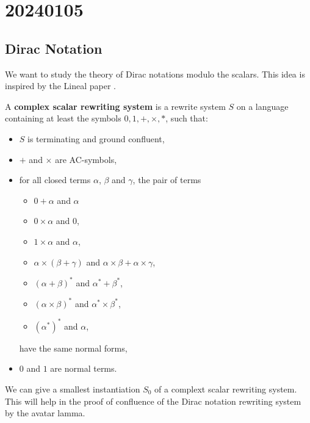 \chapter{20240105}

\newcommand*{\unit}{\texttt{unit}}
\newcommand*{\utt}{\texttt{tt}}
\newcommand*{\fst}{\texttt{fst}}
\newcommand*{\snd}{\texttt{snd}}
\newcommand*{\reduce}{\ \triangleright\ }

\section{Dirac Notation}

We want to study the theory of Dirac notations modulo the scalars. This idea is inspired by the Lineal paper \cite{Arrighi2017}.

\begin{definition}
  A \textbf{complex scalar rewriting system} is a rewrite system $S$ on a language containing at least the symbols $0, 1, +, \times, *$, such that:
  \begin{itemize}
    \item $S$ is terminating and ground confluent,
    \item $+$ and $\times$ are AC-symbols,
    \item for all closed terms $\alpha$, $\beta$ and $\gamma$, the pair of terms
      \begin{itemize}
        \item $0 + \alpha$ and $\alpha$
        \item $0 \times \alpha$ and $0$,
        \item $1 \times \alpha$ and $\alpha$,
        \item $\alpha \times (\beta + \gamma)$ and $\alpha \times \beta + \alpha \times \gamma$,
        \item $(\alpha + \beta)^*$ and $\alpha^* + \beta^*$,
        \item $(\alpha \times \beta)^*$ and $\alpha^* \times \beta^*$,
        \item $(\alpha^*)^*$ and $\alpha$,
      \end{itemize}
      have the same normal forms,
    \item $0$ and $1$ are normal terms.
  \end{itemize}
\end{definition}

We can give a smallest instantiation $S_0$ of a complext scalar rewriting system. This will help in the proof of confluence of the Dirac notation rewriting system by the avatar lamma.

